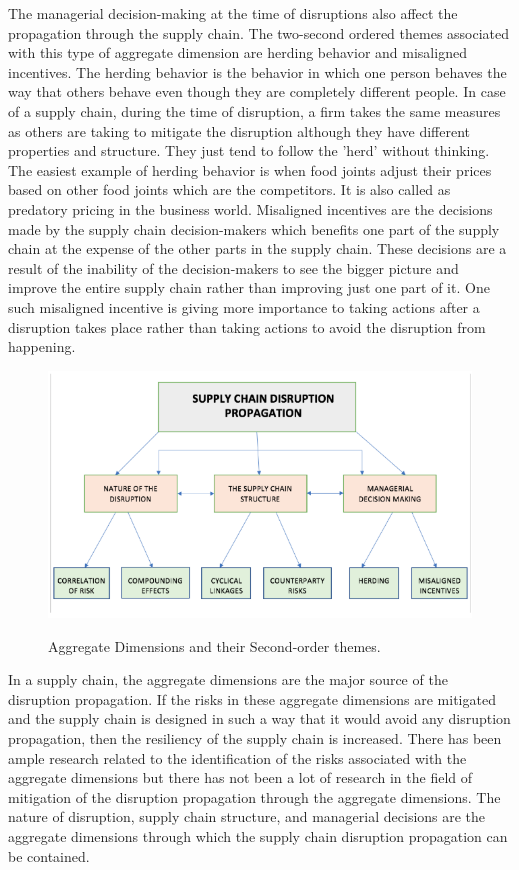 The managerial decision-making at the time of disruptions also affect the propagation through the supply chain. The two-second ordered themes associated with this type of aggregate dimension are herding behavior and misaligned incentives. The herding behavior is the behavior in which one person behaves the way that others behave even though they are completely different people. In case of a supply chain, during the time of disruption, a firm takes the same measures as others are taking to mitigate the disruption although they have different properties and structure. They just tend to follow the 'herd' without thinking. The easiest example of herding behavior is when food joints adjust their prices based on other food joints which are the competitors. It is also called as predatory pricing in the business world. Misaligned incentives are the decisions made by the supply chain decision-makers which benefits one part of the supply chain at the expense of the other parts in the supply chain. These decisions are a result of the inability of the decision-makers to see the bigger picture and improve the entire supply chain rather than improving just one part of it. One such misaligned incentive is giving more importance to taking actions after a disruption takes place rather than taking actions to avoid the disruption from happening. 


\begin{figure}[H]
  \centering
  \includegraphics[width=5.0in]{figures/pdf/Aggregate-Dimensions.png}\\
  \caption{Aggregate Dimensions and their Second-order themes.}\label{Aggregate Dimensions}
\end{figure}

In a supply chain, the aggregate dimensions are the major source of the disruption propagation. If the risks in these aggregate dimensions are mitigated and the supply chain is designed in such a way that it would avoid any disruption propagation, then the resiliency of the supply chain is increased. There has been ample research related to the identification of the risks associated with the aggregate dimensions but there has not been a lot of research in the field of mitigation of the disruption propagation through the aggregate dimensions. The nature of disruption, supply chain structure, and managerial decisions are the aggregate dimensions through which the supply chain disruption propagation can be contained.


